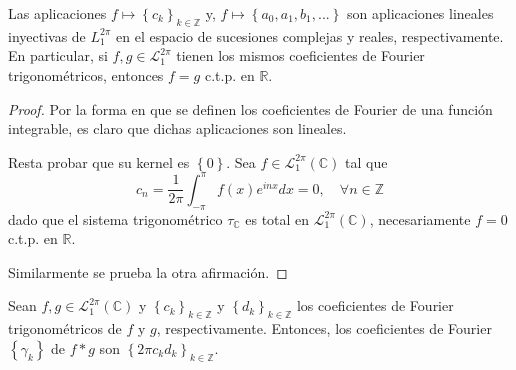 \documentclass[12pt]{report}
\theoremstyle{largebreak}
\begin{document}
    \begin{theor}
        Las aplicaciones $f\mapsto \left\{c_k \right\}_{ k\in\mathbb{Z}}$ y, $f\mapsto\left\{a_0,a_1,b_1,... \right\}$ son aplicaciones lineales inyectivas de $L_1^{2\pi}$ en el espacio de sucesiones complejas y reales, respectivamente. En particular, si $f,g\in\mathcal{L}_1^{2\pi}$ tienen los mismos coeficientes de Fourier trigonométricos, entonces $f=g$ c.t.p. en $\mathbb{R}$.
    \end{theor}

    \begin{proof}
        Por la forma en que se definen los coeficientes de Fourier de una función integrable, es claro que dichas aplicaciones son lineales.

        Resta probar que su kernel es $\left\{0\right\}$. Sea $f\in\mathcal{L}_1^{2\pi}(\mathbb{C})$ tal que
        \begin{equation*}
            c_n=\frac{1}{2\pi}\int_{-\pi}^{\pi}f(x)e^{ inx}dx=0,\quad\forall n\in\mathbb{Z}
        \end{equation*}
        dado que el sistema trigonométrico $\tau_{\mathbb{C}}$ es total en $\mathcal{L}_1^{2\pi}(\mathbb{C})$, necesariamente $f=0$ c.t.p. en $\mathbb{R}$.

        Similarmente se prueba la otra afirmación.
    \end{proof}

    \begin{propo}
        Sean $f,g\in\mathcal{L}_1^{2\pi}(\mathbb{C})$ y $\left\{c_k \right\}_{k\in\mathbb{Z}}$ y $\left\{d_k \right\}_{ k\in\mathbb{Z}}$ los coeficientes de Fourier trigonométricos de $f$ y $g$, respectivamente. Entonces, los coeficientes de Fourier $\left\{\gamma_k \right\}$ de $f*g$ son $\left\{2\pi c_kd_k \right\}_{ k\in\mathbb{Z}}$.
    \end{propo}
\end{document}

